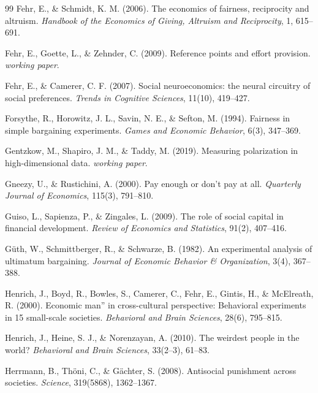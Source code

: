 \documentclass[12pt,oneside]{book}
\begin{document}
\begin{thebibliography}{99}
  Fehr, E., \& Schmidt, K. M. (2006). The economics of fairness, reciprocity and altruism.
  \textit{Handbook of the Economics of Giving, Altruism and Reciprocity}, 1, 615--691.

  Fehr, E., Goette, L., \& Zehnder, C. (2009). Reference points and effort provision.
  \textit{working paper}.

  Fehr, E., \& Camerer, C. F. (2007). Social neuroeconomics: the neural circuitry of social preferences.
  \textit{Trends in Cognitive Sciences}, 11(10), 419--427.

  Forsythe, R., Horowitz, J. L., Savin, N. E., \& Sefton, M. (1994). Fairness in simple bargaining experiments.
  \textit{Games and Economic Behavior}, 6(3), 347--369.

  Gentzkow, M., Shapiro, J. M., \& Taddy, M. (2019). Measuring polarization in high-dimensional data.
  \textit{working paper}.

  Gneezy, U., \& Rustichini, A. (2000). Pay enough or don't pay at all.
  \textit{Quarterly Journal of Economics}, 115(3), 791--810.

  Guiso, L., Sapienza, P., \& Zingales, L. (2009). The role of social capital in financial development.
  \textit{Review of Economics and Statistics}, 91(2), 407--416.

  Güth, W., Schmittberger, R., \& Schwarze, B. (1982). An experimental analysis of ultimatum bargaining.
  \textit{Journal of Economic Behavior \& Organization}, 3(4), 367--388.

  Henrich, J., Boyd, R., Bowles, S., Camerer, C., Fehr, E., Gintis, H., \& McElreath, R. (2000).
  Economic man'' in cross-cultural perspective: Behavioral experiments in 15 small-scale societies.
  \textit{Behavioral and Brain Sciences}, 28(6), 795--815.

  Henrich, J., Heine, S. J., \& Norenzayan, A. (2010). The weirdest people in the world?
  \textit{Behavioral and Brain Sciences}, 33(2--3), 61--83.

  Herrmann, B., Thöni, C., \& Gächter, S. (2008). Antisocial punishment across societies.
  \textit{Science}, 319(5868), 1362--1367.


\end{thebibliography}
\end{document}
